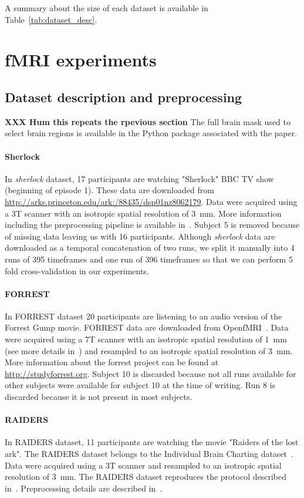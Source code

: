 A summary about the size of each dataset is available in Table~\ref{tab:dataset_desc}.


\section{fMRI experiments}
\label{sec:app_expts}
\subsection{Dataset description and preprocessing}
\label{preprocessing}
\textbf{XXX Hum this repeats the rpevious section}
The full brain mask used to select brain regions is available in the Python package associated with the paper.

\paragraph{Sherlock}
In \emph{sherlock} dataset, 17 participants are watching "Sherlock" BBC TV show (beginning of episode 1). 
%
These data are downloaded from \url{http://arks.princeton.edu/ark:/88435/dsp01nz8062179}. 
%
Data were acquired using a 3T scanner with an isotropic spatial resolution of 3 mm. 
%
More information including the preprocessing pipeline is available in~\cite{chen2017shared}.
%
Subject 5 is removed because of missing data leaving us with 16 participants.
%
Although \emph{sherlock} data are downloaded as a temporal concatenation of two runs, we split it manually into 4 runs of 395 timeframes and one run of 396 timeframes so that we can perform 5 fold cross-validation in our experiments.


\paragraph{FORREST}
In FORREST dataset 20 participants are listening to an audio version of the Forrest Gump  movie.
%
FORREST data are downloaded from OpenfMRI~\cite{poldrack2013toward}. 
%
Data were acquired using a 7T scanner with an isotropic spatial resolution of 1~mm (see more details in~\cite{hanke2014high}) and resampled to an isotropic spatial resolution of 3~mm.
%
More information about the forrest project can be found at \url{http://studyforrest.org}.
%
Subject 10 is discarded because not all runs available for other subjects were available for subject 10 at the time of writing.
%
Run 8 is discarded because it is not present in most subjects.
 
\paragraph{RAIDERS}
In RAIDERS dataset, 11 participants are watching the movie "Raiders of the lost ark".
% 
The RAIDERS dataset belongs to the Individual Brain Charting dataset~\cite{ibc}.
% 
Data were acquired using a 3T scanner and resampled to an isotropic spatial resolution of 3~mm.
% 
The RAIDERS dataset reproduces the protocol described in~\cite{haxby2011common}.
%
Preprocessing details are described in~\cite{ibc}.

